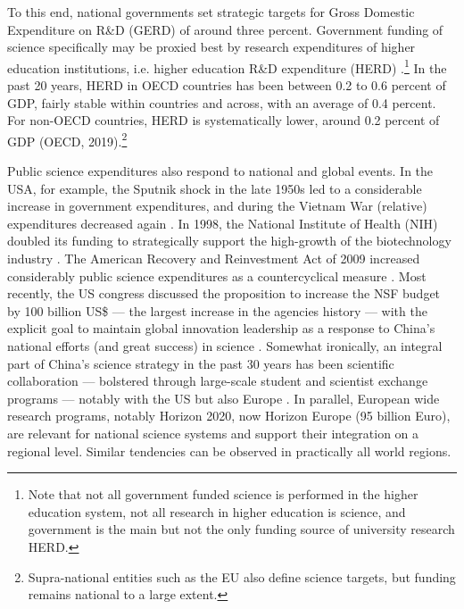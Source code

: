 To this end, national governments set strategic targets for Gross Domestic Expenditure on R\&D (GERD) of around three percent. Government funding of science specifically may be proxied best by research expenditures of higher education institutions, i.e. higher education R\&D expenditure (HERD) \cite{stephan2010economics}.\footnote{Note that not all government funded science is performed in the higher education system, not all research in higher education is science, and government is the main but not the only funding source of university research HERD.} In the past 20 years, HERD in OECD countries has been between 0.2 to 0.6 percent of GDP, fairly stable within countries and across, with an average of 0.4 percent. For non-OECD countries, HERD is systematically lower, around 0.2 percent of GDP (OECD, 2019).\footnote{Supra-national entities such as the EU also define science targets, but funding remains national to a large extent.}

Public science expenditures also respond to national and global events. In the USA, for example, the Sputnik shock in the late 1950s led to a considerable increase in government expenditures, and during the Vietnam War (relative) expenditures decreased again \citep{stephan2010economics}. In 1998, the National Institute of Health (NIH) doubled its funding to strategically support the high-growth of the biotechnology industry \citep{zucker1994intellectual}. The American Recovery and Reinvestment Act of 2009 increased considerably public science expenditures as a countercyclical measure \citep{stephan2010economics}. Most recently, the US congress discussed the proposition to increase the NSF budget by 100 billion US\$ --- the largest increase in the agencies history --- with the explicit goal to maintain global innovation leadership as a response to China's national efforts (and great success) in science \citep{Mervis2021,remmel2021us}. Somewhat ironically, an integral part of China's science strategy in the past 30 years has been scientific collaboration --- bolstered through large-scale student and scientist exchange programs --- notably with the US but also Europe \citep{wang2017sets}. In parallel, European wide research programs, notably Horizon 2020, now Horizon Europe (95 billion Euro), are relevant for national science systems and support their integration on a regional level. Similar tendencies can be observed in practically all world regions. 

